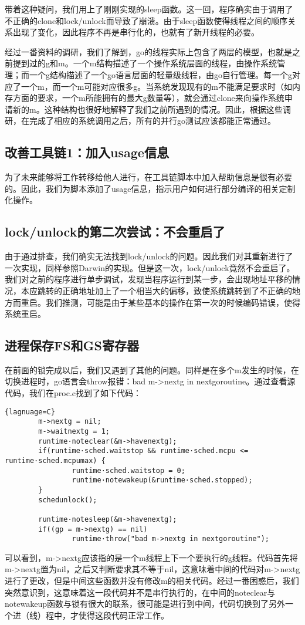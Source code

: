 \documentclass{article}
\begin{document}
带着这种疑问，我们用上了刚刚实现的sleep函数。这一回，程序确实由于调用了不正确的clone和lock/unlock而导致了崩溃。由于sleep函数使得线程之间的顺序关系出现了变化，因此程序不再是串行化的，也就有了新开线程的必要。

经过一番资料的调研，我们了解到，go的线程实际上包含了两层的模型，也就是之前提到过的g和m。一个m结构描述了一个操作系统层面的线程，由操作系统管理；而一个g结构描述了一个go语言层面的轻量级线程，由go自行管理。每一个g对应了一个m，而一个m可能对应很多g。当系统发现现有的m不能满足要求时（如内存方面的要求，一个m所能拥有的最大g数量等），就会通过clone来向操作系统申请新的m。这种结构也很好地解释了我们之前所遇到的情况。因此，根据这些调研，在完成了相应的系统调用之后，所有的并行go测试应该都能正常通过。

\subsection{改善工具链1：加入usage信息}
为了未来能够将工作转移给他人进行，在工具链脚本中加入帮助信息是很有必要的。因此，我们为脚本添加了usage信息，指示用户如何进行部分编译的相关定制化操作。

\subsection{lock/unlock的第二次尝试：不会重启了}
由于通过排查，我们确实无法找到lock/unlock的问题。因此我们对其重新进行了一次实现，同样参照Darwin的实现。但是这一次，lock/unlock竟然不会重启了。我们对之前的程序进行单步调试，发现当程序运行到某一步，会出现地址平移的情况，本应跳转的正确地址加上了一个相当大的偏移，致使系统跳转到了不正确的地方而重启。我们推测，可能是由于某些基本的操作在第一次的时候编码错误，使得系统重启。

\subsection{进程保存FS和GS寄存器}
在前面的锁完成以后，我们又遇到了其他的问题。同样是在多个m发生的时候，在切换进程时，go语言会throw报错：bad m->nextg in nextgoroutine。通过查看源代码，我们在proc.c找到了如下代码：
\begin{lstlisting}{lagnuage=C}
        m->nextg = nil;
        m->waitnextg = 1;
        runtime·noteclear(&m->havenextg);
        if(runtime·sched.waitstop && runtime·sched.mcpu <= runtime·sched.mcpumax) {
                runtime·sched.waitstop = 0;
                runtime·notewakeup(&runtime·sched.stopped);
        }
        schedunlock();

        runtime·notesleep(&m->havenextg);
        if((gp = m->nextg) == nil)
                runtime·throw("bad m->nextg in nextgoroutine");
\end{lstlisting}
可以看到，m->nextg应该指的是一个m线程上下一个要执行的g线程。代码首先将m->nextg置为nil，之后又判断要求其不等于nil，这意味着中间的代码对m->nextg进行了更改，但是中间这些函数并没有修改m的相关代码。经过一番困惑后，我们突然意识到，这意味着这一段代码并不是串行执行的，在中间的noteclear与notewakeup函数与锁有很大的联系，很可能是进行到中间，代码切换到了另外一个进（线）程中，才使得这段代码正常工作。
\end{document}
